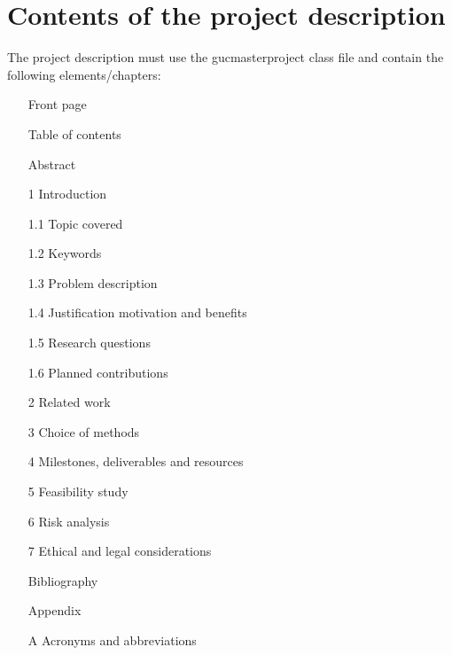 \documentclass[macs]{gucmasterproject}
\begin{document}
\thesisdate{\gucmasterthesisdate}
\makefrontpages %






\tableofcontents

\chapter{Contents of the project description}
The project description must use the gucmasterproject class file and contain the following elements/chapters:
\begin{itemize}
\item[] Front page
\item[] Table of contents
\item[] Abstract
\item[1] Introduction
\item[1.1] Topic covered
\item[1.2] Keywords
\item[1.3] Problem description
\item[1.4] Justification motivation and benefits
\item[1.5] Research questions
\item[1.6] Planned contributions
\item[2]Related work
\item[3] Choice of methods
\item[4]Milestones, deliverables and resources
\item[5]Feasibility study
\item[6]Risk analysis
\item[7]Ethical and legal considerations
\item[] Bibliography
\item[] Appendix
\item[A] Acronyms and abbreviations

\end{itemize}
\end{document}
